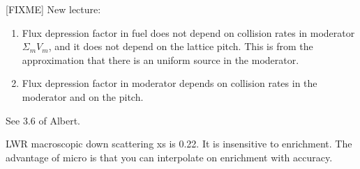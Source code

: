 \documentclass{school-22.211-notes}
\begin{document}
[FIXME] New lecture: 
\begin{enumerate}
\item Flux depression factor in fuel does not depend on collision rates in moderator $\Sigma_m V_m$, and it does not depend on the lattice pitch. This is from the approximation that there is an uniform source in the moderator. 

\item Flux depression factor in moderator depends on collision rates in the moderator and on the pitch. 

\end{enumerate}

See 3.6 of Albert. 

LWR macroscopic down scattering xs is 0.22. It is insensitive to enrichment. The advantage of micro is that you can interpolate on enrichment with accuracy. 
\end{document}
